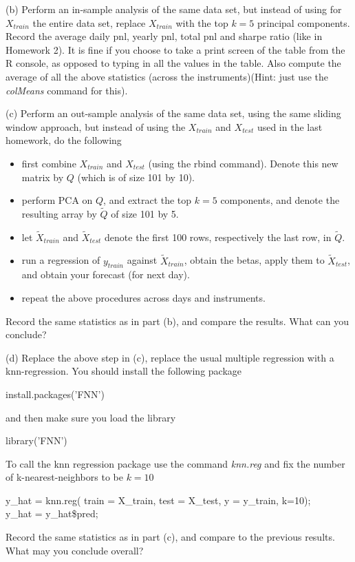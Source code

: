 \documentclass[12pt]{article}
\begin{document}
(b) Perform an in-sample analysis of the same data set, but instead of using for $X_{train}$  the entire data set, replace  $X_{train}$  with the top $k=5$ principal components. Record the average daily pnl, yearly pnl, total pnl and sharpe ratio (like in Homework 2). It is fine if you choose to take a print screen of the table from the R console, as opposed to typing in all the values in the table. Also compute the average of all the above statistics (across the instruments)(Hint: just use the \textit{colMeans} command for this).

(c)  Perform an out-sample analysis of the same data set, using the same sliding window approach, but instead of using the $X_{train}$ and $X_{test}$ used in the last homework, do the following
\begin{itemize}
\item first combine $X_{train}$ and $X_{test}$ (using the rbind command). Denote this new matrix by $Q$ (which is of size 101 by 10).
\item perform PCA on $Q$, and extract the top $k=5$ components, and denote the resulting array by $\tilde{Q}$ of size 101 by 5.
\item let $\tilde{X}_{train}$ and $\tilde{X}_{test}$ denote the first 100 rows, respectively the last row, in $\tilde{Q}$.
\item run a regression of $y_{train}$ against $\tilde{X}_{train}$, obtain the betas, apply them to $\tilde{X}_{test}$, and obtain your forecast (for next day).
\item repeat the above procedures across days and instruments. 
\end{itemize}
Record the same statistics as in part (b), and compare the results. What can you conclude?

(d) Replace the above step in (c), replace the usual multiple regression with a knn-regression. You should install the following package
\begin{center}
	install.packages('FNN')
\end{center}
and then make sure you load the library 
\begin{center}
	library('FNN')
\end{center}
To call the knn regression package use the command \textit{knn.reg}
and fix the number of k-nearest-neighbors to be $k=10$
\begin{center}
y\_hat = knn.reg( train = X\_train, test = X\_test, y = y\_train, k=10);\\
y\_hat = y\_hat\$pred;
\end{center}
Record the same statistics as in part (c), and compare to the previous results. What may you conclude overall?
\end{document}
